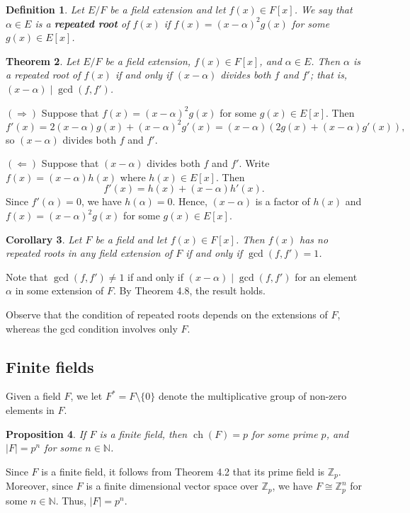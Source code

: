 \documentclass[10pt]{article}
\makeatletter
\newcommand{\N}{\mathbb{N}}
\newcommand{\Z}{\mathbb{Z}}
\DeclareMathOperator{\ch}{ch}
\theoremstyle{newstyle}
\newtheorem{thm}{Theorem}[section]
\newtheorem{cor}[thm]{Corollary}
\newtheorem{prop}[thm]{Proposition}
\newtheorem{defn}[thm]{Definition}
\newenvironment{pf}[1][\proofname]{\par
  \pushQED{\qed}%
  \normalfont \topsep0\p@\relax
  \trivlist
  \item[\hskip\labelsep\scshape
  #1\@addpunct{.}]\ignorespaces
}{%
  \popQED\endtrivlist\@endpefalse
}
\makeatother
\begin{document}
\begin{defn}
Let $E/F$ be a field extension and let $f(x) \in F[x]$. We say that $\alpha \in E$ is a {\bf repeated 
root} of $f(x)$ if $f(x) = (x - \alpha)^2 g(x)$ for some $g(x) \in E[x]$. 
\end{defn}

\begin{thm}
Let $E/F$ be a field extension, $f(x) \in F[x]$, and $\alpha \in E$. 
Then $\alpha$ is a repeated root of $f(x)$ if and only if $(x - \alpha)$ divides both 
$f$ and $f'$; that is, $(x-\alpha) \mid \gcd(f, f')$. 
\end{thm}
\begin{pf}
$(\Rightarrow)$ Suppose that $f(x) = (x-\alpha)^2 g(x)$ for some $g(x) \in E[x]$. 
Then 
\[ f'(x) = 2(x-\alpha) g(x) + (x-\alpha)^2 g'(x) = (x-\alpha) (2g(x) + (x-\alpha)g'(x)), \]
so $(x-\alpha)$ divides both $f$ and $f'$. 

$(\Leftarrow)$ Suppose that $(x - \alpha)$ divides both $f$ and $f'$. Write $f(x) = 
(x-\alpha) h(x)$ where $h(x) \in E[x]$. Then 
\[ f'(x) = h(x) + (x-\alpha) h'(x). \]
Since $f'(\alpha) = 0$, we have $h(\alpha) = 0$. Hence, $(x-\alpha)$ is a factor of $h(x)$ 
and $f(x) = (x-\alpha)^2 g(x)$ for some $g(x) \in E[x]$. 
\end{pf}

\begin{cor}
Let $F$ be a field and let $f(x) \in F[x]$. Then $f(x)$ has no repeated roots in any field extension of 
$F$ if and only if $\gcd(f, f') = 1$. 
\end{cor}
\begin{pf}
Note that $\gcd(f, f') \neq 1$ if and only if $(x-\alpha) \mid \gcd(f, f')$ for 
an element $\alpha$ in some extension of $F$. By Theorem 4.8, the result holds. 
\end{pf}

Observe that the condition of repeated roots depends on the extensions of $F$, 
whereas the gcd condition involves only $F$. 

\subsection{Finite fields}
Given a field $F$, we let $F^* = F \setminus \{0\}$ denote the multiplicative 
group of non-zero elements in $F$. 

\begin{prop}
If $F$ is a finite field, then $\ch(F) = p$ for some prime $p$, and 
$|F| = p^n$ for some $n \in \N$. 
\end{prop}
\begin{pf}
Since $F$ is a finite field, it follows from Theorem 4.2 that its prime field is $\Z_p$. 
Moreover, since $F$ is a finite dimensional vector space over $\Z_p$, we have $F \cong \Z_p^n$ 
for some $n \in \N$. Thus, $|F| = p^n$. 
\end{pf}
\end{document}
